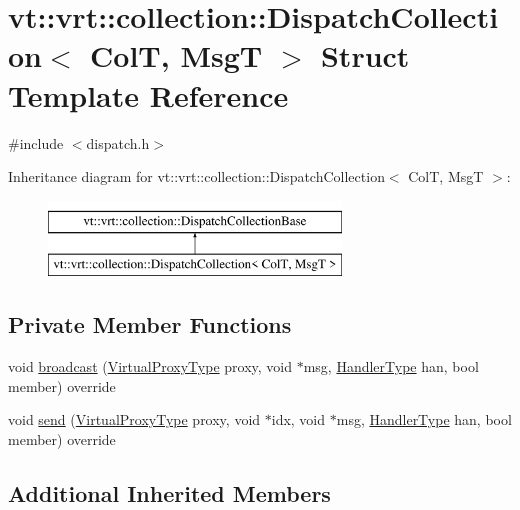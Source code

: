 \hypertarget{structvt_1_1vrt_1_1collection_1_1_dispatch_collection}{}\section{vt\+:\+:vrt\+:\+:collection\+:\+:Dispatch\+Collection$<$ ColT, MsgT $>$ Struct Template Reference}
\label{structvt_1_1vrt_1_1collection_1_1_dispatch_collection}


{\ttfamily \#include $<$dispatch.\+h$>$}

Inheritance diagram for vt\+:\+:vrt\+:\+:collection\+:\+:Dispatch\+Collection$<$ ColT, MsgT $>$\+:\begin{figure}[H]
\begin{center}
\leavevmode
\includegraphics[height=2.000000cm]{structvt_1_1vrt_1_1collection_1_1_dispatch_collection}
\end{center}
\end{figure}
\subsection*{Private Member Functions}
\begin{DoxyCompactItemize}
\item 
void \hyperlink{structvt_1_1vrt_1_1collection_1_1_dispatch_collection_aac39e73dc1609a4c865b3e69c55355ec}{broadcast} (\hyperlink{namespacevt_a1b417dd5d684f045bb58a0ede70045ac}{Virtual\+Proxy\+Type} proxy, void $\ast$msg, \hyperlink{namespacevt_af64846b57dfcaf104da3ef6967917573}{Handler\+Type} han, bool member) override
\item 
void \hyperlink{structvt_1_1vrt_1_1collection_1_1_dispatch_collection_af44ce95c566067f26f1b4bdf2bcb49a6}{send} (\hyperlink{namespacevt_a1b417dd5d684f045bb58a0ede70045ac}{Virtual\+Proxy\+Type} proxy, void $\ast$idx, void $\ast$msg, \hyperlink{namespacevt_af64846b57dfcaf104da3ef6967917573}{Handler\+Type} han, bool member) override
\end{DoxyCompactItemize}
\subsection*{Additional Inherited Members}


